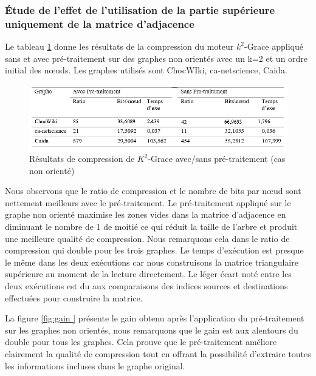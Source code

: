 \subsubsection{Étude de l'effet de l'utilisation de la partie supérieure uniquement de la matrice d'adjacence}


Le tableau \ref{fig:tab-pret } donne les résultats de la compression du moteur $k^2$-Grace appliqué sans et avec pré-traitement sur des graphes non orientés avec un k=2 et un ordre initial des nœuds. Les graphes utilisés sont ChocWIki, ca-netscience, Caida. 
 

\begin{figure}[H]
	\centering
	\includegraphics[scale=0.9]{ressources/image/Tests/tab-pret.png}
	\caption{Résultats de compression de $K^2$-Grace avec/sans pré-traitement (cas non orienté)}
	\label{fig:tab-pret }
\end{figure}

Nous observons que le ratio de compression et le nombre de bits par nœud sont nettement meilleurs avec le pré-traitement. Le pré-traitement appliqué sur le graphe non orienté maximise les zones vides dans la matrice d'adjacence en diminuant le nombre de 1 de moitié ce qui réduit la taille de l'arbre et produit une meilleure qualité de compression. Nous remarquons cela dans le ratio de compression qui double pour les trois graphes. Le temps d'exécution est presque le même dans les deux exécutions car nous construisons la matrice triangulaire supérieure au moment de la lecture directement. Le léger écart noté entre les deux exécutions est du aux comparaisons des indices sources et destinations effectuées pour construire la matrice. 

La figure \ref{fig:gain } présente le gain obtenu après l'application du pré-traitement sur les graphes non orientés, nous remarquons que le gain est aux alentours du double pour tous les graphes. Cela prouve que le pré-traitement améliore clairement la qualité de compression tout en offrant la possibilité d'extraire toutes les informations incluses dans le graphe original.

